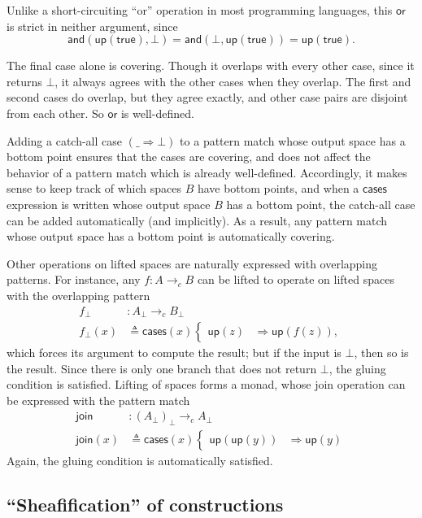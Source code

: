 \documentclass[conference]{IEEEtran}
\newcommand{\cto}{\to_c}
\newcommand{\wildcard}{\_}
\newcommand{\Branch}{\Rightarrow}
\newcommand{\up}{\mathsf{up}}
\begin{document}
Unlike a short-circuiting ``or'' operation in most programming languages, this $\mathsf{or}$ is strict in neither argument, since
\[ 
\mathsf{and}(\mathsf{up}(\mathsf{true}), \bot) = 
\mathsf{and}(\bot, \mathsf{up}(\mathsf{true})) =
\mathsf{up}(\mathsf{true}).
\]

The final case alone is covering. Though it overlaps with every other case, since it returns $\bot$, it always agrees with the other cases when they overlap. The first and second cases do overlap, but they agree exactly, and other case pairs are disjoint from each other. So $\mathsf{or}$ is well-defined.

Adding a catch-all case $(\wildcard \Branch \bot)$ to a pattern match whose output space has a bottom point ensures that the cases are covering, and does not affect the behavior of a pattern match which is already well-defined. Accordingly, it makes sense to keep track of which spaces $B$ have bottom points, and when a $\mathsf{cases}$ expression is written whose output space $B$ has a bottom point, the catch-all case can be added automatically (and implicitly). As a result, any pattern match whose output space has a bottom point is automatically covering.

Other operations on lifted spaces are naturally expressed with overlapping patterns. For instance, any $f : A \cto B$ can be lifted to operate on lifted spaces with the overlapping pattern
\begin{align*}
f_\bot &: A_\bot \cto B_\bot
\\ f_\bot(x) &\triangleq
  \mathsf{cases}(x)
  \begin{cases}
  \up(z) &\Branch \up(f(z)),
  \end{cases}
\end{align*}
which forces its argument to compute the result; but if the input is $\bot$, then so is the result. Since there is only one branch that does not return $\bot$, the gluing condition is satisfied. Lifting of spaces forms a monad, whose join operation can be expressed with the pattern match
\begin{align*}
\mathsf{join} &: \left( A_\bot \right)_\bot \cto A_\bot
\\ \mathsf{join}(x) &\triangleq \mathsf{cases}(x)
\begin{cases}
\up(\up(y)) &\Branch \up(y)
\end{cases}
\end{align*}
Again, the gluing condition is automatically satisfied.


\subsection{``Sheafification'' of constructions}
\end{document}
